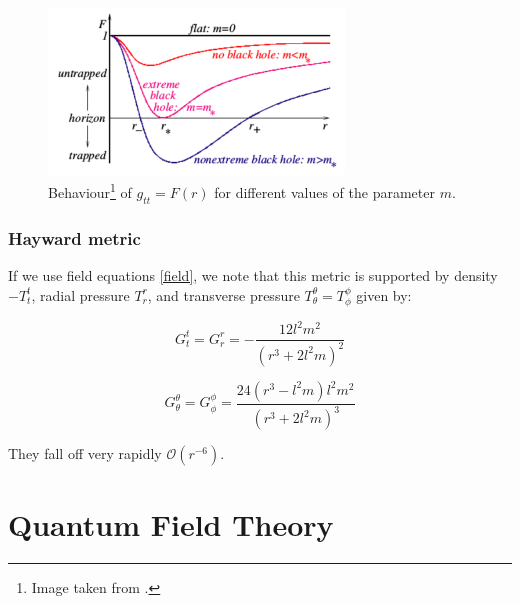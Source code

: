 \documentclass{beamer}
\begin{document}
\begin{frame}
\begin{figure}[h!]
	\centering
	\includegraphics[width=0.7\textwidth]{F(r)}
	\caption{Behaviour\footnote{Image taken from \cite{hayward}.} of $g_{tt} = F(r)$ for different values of the parameter $m$.}
	
\end{figure}

\end{frame}

\begin{frame}
\frametitle{Hayward metric}
If we use field equations \ref{field}, we note that this metric is supported by density $-T^{t}_{t}$, radial pressure $T^{r}_{r}$, and transverse pressure $T^{\theta}_{\theta} = T^{\phi}_{\phi}$ given by:

\begin{equation}
G^{t}_{t} = G^{r}_{r} = - \frac{12l^2m^2}{\left( r^3 + 2l^2m \right)^2}
\end{equation}

\begin{equation}
G^{\theta}_{\theta} = G^{\phi}_{\phi} = \frac{24\left( r^3 - l^2m \right)l^2m^2}{\left( r^3 + 2l^2m \right)^3}
\end{equation}

They fall off very rapidly $\mathcal{O}(r^{-6})$.

%
\end{frame}


\section{Quantum Field Theory}
\end{document}
